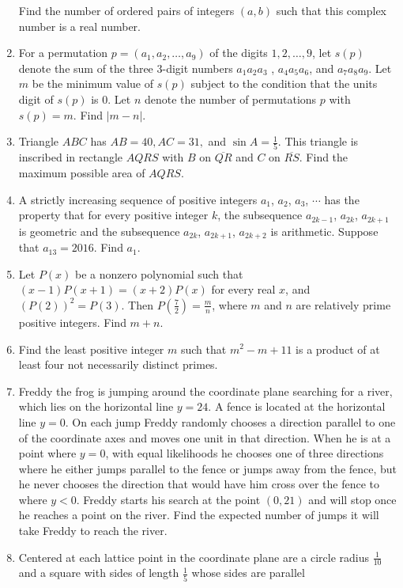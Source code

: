 \documentclass{article}
\begin{document}
\begin{enumerate}[label=\arabic*., itemsep=0.5em]
 Find the number of ordered pairs of integers $(a,b)$ such that this complex number is a real number.\par \vspace{0.5em}\item For a permutation $p = (a_1,a_2,\ldots,a_9)$ of the digits $1,2,\ldots,9$, let $s(p)$ denote the sum of the three $3$-digit numbers $a_1a_2a_3$ , $a_4a_5a_6$, and $a_7a_8a_9$. Let $m$ be the minimum value of $s(p)$ subject to the condition that the units digit of $s(p)$ is $0$. Let $n$ denote the number of permutations $p$ with $s(p) = m$. Find $|m - n|$.\par \vspace{0.5em}\item Triangle $ABC$ has $AB=40,AC=31,$ and $\sin{A}=\frac{1}{5}$. This triangle is inscribed in rectangle $AQRS$ with $B$ on $\overline{QR}$ and $C$ on $\overline{RS}$. Find the maximum possible area of $AQRS$.\par \vspace{0.5em}\item A strictly increasing sequence of positive integers $a_1$, $a_2$, $a_3$, $\cdots$ has the property that for every positive integer $k$, the subsequence $a_{2k-1}$, $a_{2k}$, $a_{2k+1}$ is geometric and the subsequence $a_{2k}$, $a_{2k+1}$, $a_{2k+2}$ is arithmetic. Suppose that $a_{13} = 2016$. Find $a_1$.\par \vspace{0.5em}\item Let $P(x)$ be a nonzero polynomial such that $(x-1)P(x+1)=(x+2)P(x)$ for every real $x$, and $\left(P(2)\right)^2 = P(3)$. Then $P(\tfrac72)=\tfrac{m}{n}$, where $m$ and $n$ are relatively prime positive integers. Find $m + n$.\par \vspace{0.5em}\item Find the least positive integer $m$ such that $m^2 - m + 11$ is a product of at least four not necessarily distinct primes.\par \vspace{0.5em}\item Freddy the frog is jumping around the coordinate plane searching for a river, which lies on the horizontal line $y = 24$. A fence is located at the horizontal line $y = 0$. On each jump Freddy randomly chooses a direction parallel to one of the coordinate axes and moves one unit in that direction. When he is at a point where $y=0$, with equal likelihoods he chooses one of three directions where he either jumps parallel to the fence or jumps away from the fence, but he never chooses the direction that would have him cross over the fence to where $y < 0$. Freddy starts his search at the point $(0, 21)$ and will stop once he reaches a point on the river. Find the expected number of jumps it will take Freddy to reach the river.\par \vspace{0.5em}\item Centered at each lattice point in the coordinate plane are a circle radius $\frac{1}{10}$ and a square with sides of length $\frac{1}{5}$ whose sides are parallel 
\end{enumerate}
\end{document}
